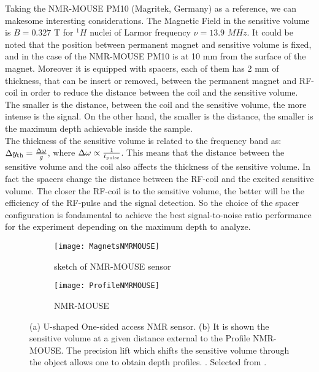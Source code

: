 \documentclass[a4paper,11pt]{report}
\begin{document}
Taking the NMR-MOUSE PM10 (Magritek, Germany) as a reference, we can makesome interesting considerations.
The Magnetic Field in the sensitive volume is $B=0.327$ T for $^1H$ nuclei of Larmor frequency  $\nu = 13.9$ $ MHz$. It could be noted that the position between permanent magnet and sensitive volume is fixed, and in the case of the NMR-MOUSE PM10 is at 10 mm from the surface of the magnet. Moreover it is equipped with spacers, each of them has 2 mm of thickness, that can be insert or removed, between the permanent magnet and RF-coil in order to reduce the distance between the coil and the sensitive volume. \\
The smaller is the distance, between the coil and the sensitive volume, the more intense is the signal. On the other hand, the smaller is the distance, the smaller is the maximum depth achievable inside the sample\cite{dodici}.\\
The thickness of the sensitive volume is related to the frequency band as:
$\Delta{y_\textup{th}}= \frac{\Delta\omega}{g}$, where $\Delta \omega \propto \frac{1}{t_\textup{pulse}}$. 
This means that the distance between the sensitive volume and the coil also affects the thickness of the sensitive volume. In fact the spacers change the distance between the RF-coil and the excited sensitive volume. The closer the RF-coil is to the sensitive volume, the better will be the efficiency of the RF-pulse and the signal detection. So the choice of the spacer configuration is fondamental to achieve the best signal-to-noise ratio performance for the experiment depending on the maximum depth to analyze\cite{dodici}.

\begin{figure}[h]
\begin{subfigure}{0.5\textwidth}
\texttt{[image: MagnetsNMRMOUSE]} 
\caption{sketch of NMR-MOUSE sensor}\label{magnets}
\end{subfigure}
\begin{subfigure}{0.5\textwidth}
\texttt{[image: ProfileNMRMOUSE]}
\caption{NMR-MOUSE}\label{NMRprofile}
\end{subfigure}
 


\caption{(a) U-shaped One-sided access NMR sensor. (b) It is shown the sensitive volume at a given distance external to the Profile NMR-MOUSE. The precision lift which shifts the sensitive volume through the object allows one to obtain depth profiles.
. Selected from \cite{cinque}.}
\end{figure}
\end{document}
